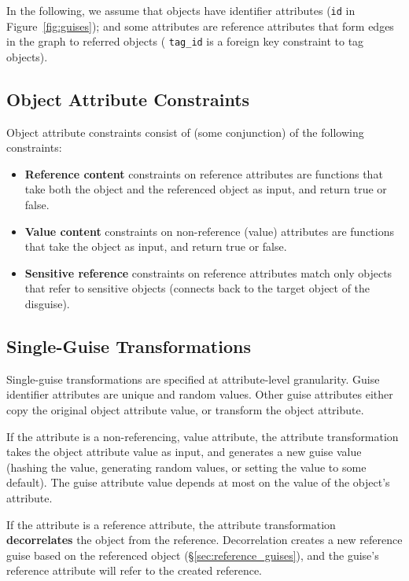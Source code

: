 %
In the following, we assume that objects have identifier attributes (\eg \texttt{id} in Figure~\ref{fig:guises}); and
some attributes are reference attributes that form edges in the graph to referred objects (\eg
\texttt{tag\_id} is a foreign key constraint to tag objects).

\subsection{Object Attribute Constraints}
\label{sec:constraints} 

Object attribute constraints consist of (some conjunction) of the following constraints:
\begin{itemize}[nosep]
\item \textbf{Reference content} constraints on reference attributes are functions that
    take both the object and the referenced object as input, and return true or false. 
\item \textbf{Value content} constraints on non-reference (value) attributes are functions that take the object as
input, and return true or false.  
\item \textbf{Sensitive reference} constraints on reference attributes match only objects that refer
    to sensitive objects (\ie connects back to the target object of the disguise).
\end{itemize}

\subsection{Single-Guise Transformations}
\label{sec:single_guise} 
Single-guise transformations are specified at attribute-level granularity. 
Guise identifier attributes are unique and random values. 
%
Other guise attributes either copy the original object attribute value, 
or transform the object attribute.  

If the attribute is a non-referencing, value attribute, the attribute transformation takes the
object attribute value as input, and generates a new guise value (\eg hashing the value, generating
random values, or setting the value to some default).  The guise attribute value depends at most on
the value of the object's attribute.

If the attribute is a reference attribute, the attribute transformation \textbf{decorrelates} the 
object from the reference. Decorrelation creates a new reference guise based on the referenced
object (\S\ref{sec:reference_guises}), and the guise's reference attribute will refer to the
created reference.

